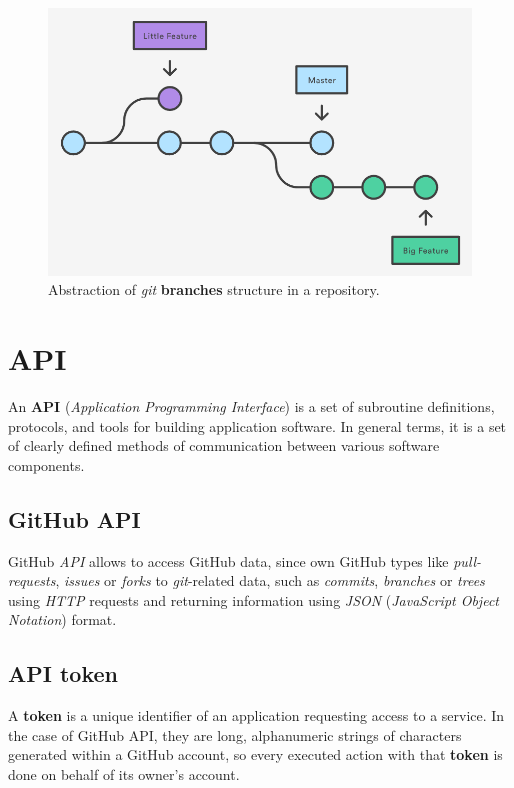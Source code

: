 \documentclass[a4paper, 12pt]{book}
\begin{document}
\begin{figure}
  \centering
  \includegraphics[width=12cm, keepaspectratio]{img/branches-example-atlassian}
  \caption{Abstraction of \emph{git} \textbf{branches} structure in a repository.}
  \label{fig:git-branches-example}
\end{figure}
\section{API}
\label{sec:api}
An \textbf{API} (\textit{Application Programming Interface}) is a set of subroutine definitions, protocols, and tools for building
application software. In general terms, it is a set of clearly defined methods of communication between various software components.
\subsection{GitHub API}
\label{ssec:sec_gh-api}
GitHub \textit{API} allows to access GitHub data, since own GitHub types like \textit{pull-requests}, \textit{issues} or \textit{forks}
to \emph{git}-related data, such as \textit{commits}, \textit{branches} or \textit{trees} using \textit{HTTP} requests and
returning information using \emph{JSON} (\textit{JavaScript Object Notation}) format.
\subsection{API token}
\label{ssec:api-token}
A \textbf{token} is a unique identifier of an application requesting access to a service.
In the case of GitHub API, they are long, alphanumeric strings of characters generated within a GitHub account,
so every executed action with that \textbf{token} is done on behalf of its owner's account.
\end{document}
